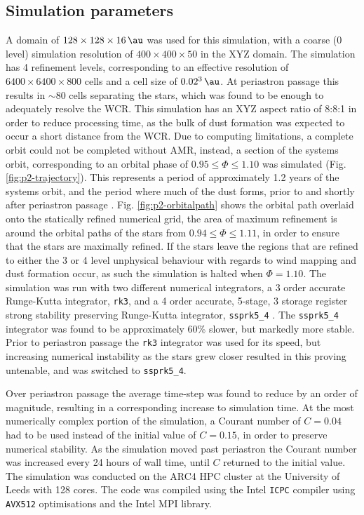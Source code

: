\subsection{Simulation parameters}


A domain of $128 \times 128 \times 16 \, \si{\au}$ was used for this simulation, with a coarse (0 level) simulation resolution of $400\times 400 \times 50$ in the XYZ domain.
The simulation has 4 refinement levels, corresponding to an effective resolution of $6400 \times 6400 \times 800$ cells and a cell size of $0.02^3 \, \si{\au}$.
At periastron passage this results in $\sim 80$ cells separating the stars, which was found to be enough to adequately resolve the WCR. 
This simulation has an XYZ aspect ratio of 8:8:1 in order to reduce processing time, as the bulk of dust formation was expected to occur a short distance from the WCR.
Due to computing limitations, a complete orbit could not be completed without AMR, instead, a section of the systems orbit, corresponding to an orbital phase of $0.95 \leq \Phi \leq 1.10$ was simulated (Fig. \ref{fig:p2-trajectory}).
This represents a period of approximately \num{1.2} years of the systems orbit, and the period where much of the dust forms, prior to and shortly after periastron passage \parencite{crowther_dust_2003}.
Fig. \ref{fig:p2-orbitalpath} shows the orbital path overlaid onto the statically refined numerical grid, the area of maximum refinement is around the orbital paths of the stars from $0.94 \leq \Phi \leq 1.11$, in order to ensure that the stars are maximally refined.
If the stars leave the regions that are refined to either the 3 or 4 level unphysical behaviour with regards to wind mapping and dust formation occur, as such the simulation is halted when $\Phi = 1.10$.
The simulation was run with two different numerical integrators, a 3 order accurate Runge-Kutta integrator, \texttt{rk3}, and a 4 order accurate, 5-stage, 3 storage register strong stability preserving Runge-Kutta integrator, \texttt{ssprk5\_4}
\parencite{ruuthHighOrderStrongStabilityPreservingRungeKutta2005}.
The \texttt{ssprk5\_4} integrator was found to be approximately 60\% slower, but markedly more stable.
Prior to periastron passage the \texttt{rk3} integrator was used for its speed, but increasing numerical instability as the stars grew closer resulted in this proving untenable, and was switched to \texttt{ssprk5\_4}.

Over periastron passage the average time-step was found to reduce by an order of magnitude, resulting in a corresponding increase to simulation time. %
At the most numerically complex portion of the simulation, a Courant number of $C = 0.04$ had to be used instead of the initial value of $C = 0.15$, in order to preserve numerical stability.
As the simulation moved past periastron the Courant number was increased every 24 hours of wall time, until $C$ returned to the initial value.
The simulation was conducted on the ARC4 HPC cluster at the University of Leeds with 128 cores.
The code was compiled using the Intel \texttt{ICPC} compiler using \texttt{AVX512} optimisations and the Intel MPI library.

